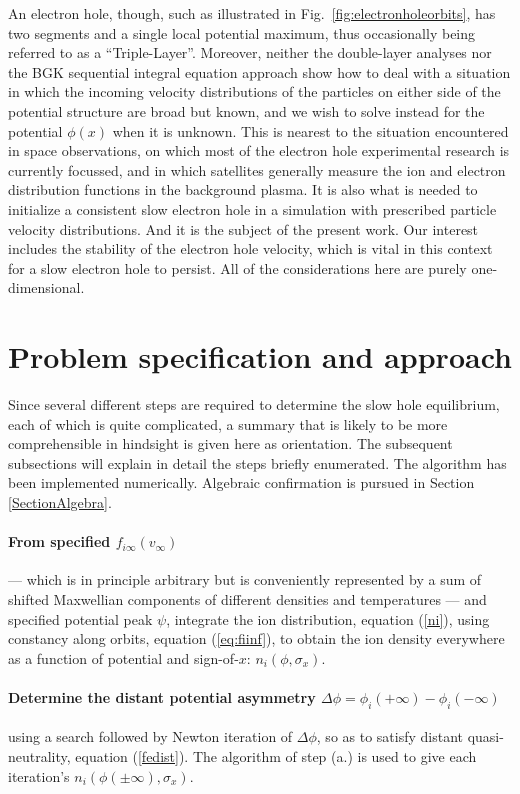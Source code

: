 \documentclass[pre]{revtex4-2}
\begin{document}
An electron hole, though, such as illustrated in Fig.\
\ref{fig:electronholeorbits}, has two segments and a single local
potential maximum, thus occasionally being referred to as a
``Triple-Layer''. Moreover, neither the double-layer analyses nor the
BGK sequential integral equation approach show how to deal with a
situation in which the incoming velocity distributions of the
particles on either side of the potential structure are broad but
known, and we wish to solve instead for the potential $\phi(x)$ when
it is unknown. This is nearest to the situation encountered in space
observations, on which most of the electron hole experimental research
is currently focussed, and in which satellites generally measure the
ion and electron distribution functions in the background plasma. It
is also what is needed to initialize a consistent slow electron hole
in a simulation with prescribed particle velocity distributions. And
it is the subject of the present work. Our interest includes the
stability of the electron hole velocity, which is vital in this
context for a slow electron hole to persist. All of the considerations
here are purely one-dimensional.

\section{Problem specification and  approach}

Since several different steps are required to determine the slow hole
equilibrium, each of which is quite complicated, a summary that is
likely to be more comprehensible in hindsight is given here as
orientation. The subsequent subsections will explain in detail
the steps briefly enumerated.  The algorithm has been
implemented numerically. Algebraic confirmation is pursued in
Section \ref{SectionAlgebra}.

\paragraph{From specified $f_{i\infty}(v_\infty)$} --- which is in
principle arbitrary but is conveniently represented by a sum of
shifted Maxwellian components of different densities and temperatures
--- and specified potential peak $\psi$, integrate the ion
distribution, equation (\ref{ni}), using constancy along orbits, equation
(\ref{eq:fiinf}), to obtain the ion density everywhere as a function of
potential and sign-of-$x$: $n_i(\phi,\sigma_x)$.

\paragraph{Determine the distant potential asymmetry
  $\Delta \phi = \phi_i(+\infty)-\phi_i(-\infty)$} using a search
followed by Newton iteration of $\Delta\phi$, so as to satisfy distant
quasi-neutrality, equation (\ref{fedist}). The algorithm of step (a.) is
used to give each iteration's $n_i(\phi(\pm\infty),\sigma_x)$.
\end{document}
